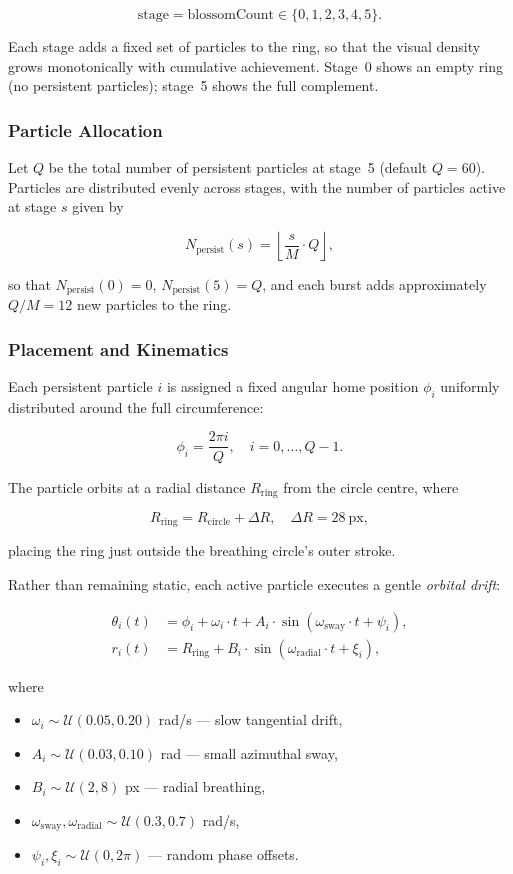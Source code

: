 \documentclass[11pt,a4paper]{article}
\begin{document}
\[
\text{stage} = \text{blossomCount} \in \{0, 1, 2, 3, 4, 5\}.
\]

Each stage adds a fixed set of particles to the ring, so that the visual
density grows monotonically with cumulative achievement. Stage~0 shows
an empty ring (no persistent particles); stage~5 shows the full
complement.

\subsubsection{Particle Allocation}

Let $Q$ be the total number of persistent particles at stage~5 (default
$Q = 60$). Particles are distributed evenly across stages, with the
number of particles active at stage $s$ given by

\[
N_{\text{persist}}(s) = \left\lfloor \frac{s}{M} \cdot Q \right\rfloor,
\]

so that $N_{\text{persist}}(0) = 0$, $N_{\text{persist}}(5) = Q$, and
each burst adds approximately $Q / M = 12$ new particles to the ring.

\subsubsection{Placement and Kinematics}

Each persistent particle $i$ is assigned a fixed angular home position
$\phi_i$ uniformly distributed around the full circumference:

\[
\phi_i = \frac{2\pi i}{Q}, \quad i = 0, \dots, Q-1.
\]

The particle orbits at a radial distance $R_{\text{ring}}$ from the
circle centre, where

\[
R_{\text{ring}} = R_{\text{circle}} + \Delta R, \quad \Delta R = 28\ \text{px},
\]

placing the ring just outside the breathing circle's outer stroke.

Rather than remaining static, each active particle executes a gentle
\textit{orbital drift}:

\begin{align*}
  \theta_i(t) &= \phi_i + \omega_i \cdot t + A_i \cdot \sin(\omega_{\text{sway}} \cdot t + \psi_i), \\
  r_i(t) &= R_{\text{ring}} + B_i \cdot \sin(\omega_{\text{radial}} \cdot t + \xi_i),
\end{align*}

where
\begin{itemize}
  \item $\omega_i \sim \mathcal{U}(0.05, 0.20)$ rad/s — slow tangential drift,
  \item $A_i \sim \mathcal{U}(0.03, 0.10)$ rad — small azimuthal sway,
  \item $B_i \sim \mathcal{U}(2, 8)$ px — radial breathing,
  \item $\omega_{\text{sway}}, \omega_{\text{radial}} \sim \mathcal{U}(0.3, 0.7)$ rad/s,
  \item $\psi_i, \xi_i \sim \mathcal{U}(0, 2\pi)$ — random phase offsets.
\end{itemize}
\end{document}
